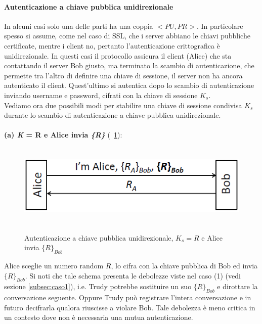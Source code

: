 \paragraph{Autenticazione a chiave pubblica unidirezionale}
In alcuni casi solo una delle parti ha una coppia $<PU, PR>$. In particolare spesso si assume, come nel caso di SSL, che i server abbiano le chiavi pubbliche certificate, mentre i client no, pertanto l'autenticazione crittografica è unidirezionale. In questi casi il protocollo assicura il client (Alice) che sta contattando il server Bob giusto, ma terminato la scambio di autenticazione, che permette tra l'altro di definire una chiave di sessione, il server non ha ancora autenticato il client. Quest'ultimo si autentica dopo lo scambio di autenticazione inviando username e password, cifrati con la chiave di sessione $K_{s}$.\\ 
Vediamo ora due possibili modi per stabilire una chiave di sessione condivisa $K_{s}$ durante lo scambio di autenticazione a chiave pubblica unidirezionale.\\ \\
\textbf{(a) \textit{K} = R e Alice invia \textit{\{R\}}} (\figurename~\ref{fig:ImgS81bis}): 
\begin{figure}[htbp]
	\centering%
	\subfigure%
	{\includegraphics[height=4cm, width=12cm, keepaspectratio]{Immagini/autenticazione/ImgS81bis.png}}
	\caption{Autenticazione a chiave pubblica unidirezionale, $K_{s} = R$ e Alice invia $\lbrace R\rbrace_{Bob}$}\label{fig:ImgS81bis} 	
\end{figure}
Alice sceglie un numero random $R$, lo cifra con la chiave pubblica di Bob ed invia $\lbrace R\rbrace_{Bob}$. Si noti che tale schema presenta le debolezze viste nel caso (1) (vedi sezione \ref{subsec:caso1}), i.e. Trudy potrebbe sostituire un suo $\lbrace R\rbrace_{Bob}$ e dirottare la conversazione seguente. Oppure Trudy può registrare l'intera conversazione e in futuro decifrarla qualora riuscisse a violare Bob. Tale debolezza è meno critica in un contesto dove non è necessaria una mutua autenticazione.\\ \\
